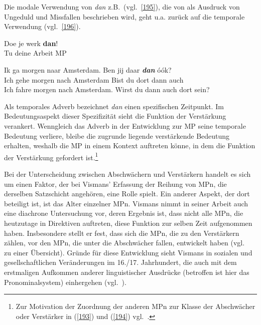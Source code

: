 Die modale Verwendung von \textit{dan} z.B.\ (vgl.\ \ref{195}), die von \citet[605]{Dale1992} als Ausdruck von Ungeduld und Missfallen beschrieben wird, geht u.a. zurück auf die temporale Verwendung (vgl.\ \ref{196}).

\begin{exe}
	\ex\label{195} 
	\gll Doe je werk \textbf{dan}!\\
	Tu deine Arbeit MP\\
\end{exe}

\begin{exe}
	\ex\label{196} 
	\gll Ik ga morgen naar Amsterdam. Ben jij daar \textbf{\textit{dan}} óók?\\
	Ich gehe morgen nach Amsterdam Bist du dort dann auch\\
	\glt Ich fahre morgen nach Amsterdam. Wirst du dann auch dort sein?
	\newline
	\hbox{}\hfill\hbox{\citet[62/61]{Vismans1994}}
\end{exe}	
Als temporales Adverb bezeichnet \textit{dan} einen spezifischen Zeitpunkt. Im Bedeutungsaspekt dieser Spezifizität sieht \citet[58--60]{Vismans1994} die Funktion der Verstärkung verankert. Wenngleich das Adverb in der Entwicklung zur MP seine temporale Bedeutung verliere, bleibe die zugrunde liegende verstärkende Bedeutung erhalten, weshalb die MP in einem Kontext auftreten könne, in dem die Funktion der Verstärkung gefordert ist.\footnote{Zur Motivation der Zuordnung der anderen MPn zur Klasse der Abschwächer oder Verstärker in (\ref{193}) und (\ref{194}) vgl.\ \citet[61--73]{Vismans1994}.}

Bei der Unterscheidung zwischen Abschwächern und Verstärkern handelt es sich um einen Faktor, der bei Vismans' Erfassung der Reihung von MPn, die derselben Satzschicht angehören, eine Rolle spielt. Ein anderer Aspekt, der dort beteiligt ist, ist das Alter einzelner MPn. Vismans nimmt in seiner Arbeit auch eine diachrone Untersuchung  vor, deren Ergebnis ist, dass nicht alle MPn, die heutzutage in Direktiven  auftreten, diese Funktion zur selben Zeit aufgenommen haben. Insbesondere stellt er fest, dass sich die MPn, die zu den Verstärkern zählen, vor den MPn, die unter die Abschwächer fallen, entwickelt haben (vgl.\ \citeyear[103]{Vismans1994} zu einer Übersicht). Gründe für diese Entwicklung sieht Vismans in sozialen und gesellschaftlichen Veränderungen im 16./17. Jahrhundert, die auch mit dem erstmaligen Aufkommen anderer linguistischer Ausdrücke (betroffen ist hier das Pronominalsystem) einhergehen (vgl.\ \citealt[102--106]{Vismans1994}).


